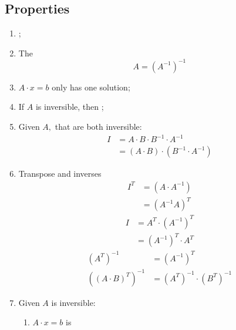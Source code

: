 \subsection{Properties}
  
  \begin{enumerate}
    \item {};
    
    \item The 
    \begin{displaymath}
      A = \left( A^{-1} \right)^{-1}
    \end{displaymath}
    
    \item $ A \cdot x = b $ only has one solution;
    
    \item If $ A $ is inversible, then ;

    \item Given $ A, $ that are both inversible:
    \begin{align*}
      I &= A \cdot B \cdot B^{-1} \cdot A^{-1} \\ 
      &= \left( A \cdot B \right) \cdot \left( B^{-1} \cdot A^{-1} \right)
    \end{align*}
    
    \item Transpose and inverses 
    \begin{align*}
      I^{T} &= \left( A \cdot A^{-1} \right) \\ 
      &= \left( A^{-1} A \right)^{T}
    \end{align*}
    \begin{align*}
      I &= A^{T} \cdot \left( A^{-1} \right)^{T} \\ 
      &= \left( A^{-1} \right)^{T} \cdot A^{T}
    \end{align*}
    \begin{align*}
      \left( A^{T} \right)^{-1} &= \left( A^{-1} \right)^{T} \\ 
      \left( \left( A \cdot B \right)^{T} \right)^{-1} &= 
      \left( A^{T} \right)^{-1} \cdot \left( B^{T} \right)^{-1}
    \end{align*}
    
    \item Given $ A $ is inversible:
    \begin{enumerate}
      \item $ A \cdot x = b $ is 
      

\end{enumerate}
\end{enumerate}
